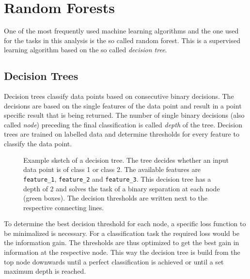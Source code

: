 \section{Random Forests}
%
One of the most frequently used machine learning algorithms and the one used
for the tasks in this analysis is the so called random forest. This is a
supervised learning algorithm based on the so called \textit{decision tree}.

\subsection{Decision Trees}
%
Decision trees classify data points based on consecutive binary decisions. The
decisions are based on the single features of the data point and result in a
point specific result that is being returned. The number of single binary
decisions (also called \textit{node}) preceding the final classification is
called \textit{depth} of the tree. Decision trees are trained on labelled data
and determine thresholds for every feature to classify the data point.
%
\begin{figure}[H]
  \centering
  \caption{Example sketch of a decision tree. The tree decides whether an input data point is of class 1 or class 2. The available features are \texttt{feature\_1}, \texttt{feature\_2} and \texttt{feature\_3}. This decision tree has a depth of 2 and solves the task of a binary separation at each node (green boxes). The decision thresholds are written next to the respective connecting lines.}
  \label{fig:tree}
\end{figure}
%
To determine the best decision threshold for each node, a specific loss function
to be minimalized is necessary. For a classification task the required
loss would be the information gain. The thresholds are thus optimized to get the best gain in information at the respective node. This way the decision tree is build from the
top node downwards until a perfect classification is achieved or until a set
maximum depth is reached.

